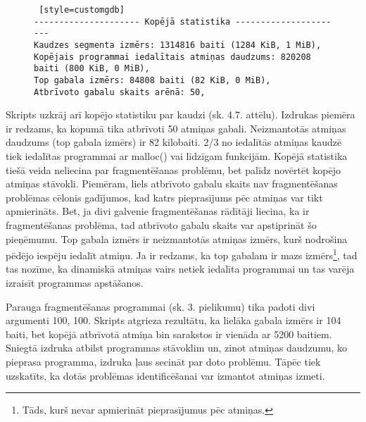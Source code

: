 \begin{figure}[h]
\begin{lstlisting} [style=customgdb]
--------------------- Kopējā statistika ----------------------
Kaudzes segmenta izmērs: 1314816 baiti (1284 KiB, 1 MiB),
Kopējais programmai iedalītais atmiņas daudzums: 820208 baiti (800 KiB, 0 MiB),
Top gabala izmērs: 84808 baiti (82 KiB, 0 MiB),
Atbrīvoto gabalu skaits arēnā: 50,
\end{lstlisting}
\caption{\textbf{\fontsize{11}{12}\selectfont {Kopējā statistika}}}
\end{figure}

Skripts uzkrāj arī kopējo statistiku par kaudzi (sk. 4.7. attēlu). Izdrukas piemēra  ir redzams, ka kopumā tika atbrīvoti 50 atmiņas gabali.
Neizmantotās atmiņas daudzums (top gabala izmērs) ir 82 kilobaiti.
2/3 no iedalītās atmiņas kaudzē tiek iedalītas programmai ar malloc() vai līdzīgam funkcijām.
Kopējā statistika tiešā veida neliecina par fragmentēšanas problēmu, bet palīdz novērtēt kopējo atmiņas stāvokli.
Piemēram, liels atbrīvoto gabalu skaits nav fragmentēšanas problēmas cēlonis gadījumos, kad katrs pieprasījums pēc atmiņas var tikt apmierināts.
Bet, ja divi galvenie fragmentēšanas rādītāji liecina, ka ir fragmentēšanas problēma, tad atbrīvoto gabalu skaits var apstiprināt šo pieņēmumu.
Top gabala izmērs ir neizmantotās atmiņas izmērs, kurš nodrošina pēdējo iespēju iedalīt atmiņu.
Ja ir redzams, ka top gabalam ir mazs izmērs\footnote{Tāds, kurš nevar apmierināt pieprasījumus pēc atmiņas.}, tad tas nozīme, ka dinamiskā atmiņas vairs netiek iedalīta programmai un tas varēja izraisīt programmas apstāšanos.

Parauga fragmentēšanas programmai (sk. 3. pielikumu) tika padoti divi argumenti 100, 100. 
Skripts atgrieza rezultātu, ka lielāka gabala izmērs ir 104 baiti, bet kopējā atbrīvotā atmiņa bin sarakstos ir vienāda ar 5200 baitiem.
Sniegtā izdruka atbilst programmas stāvoklim un, zinot atmiņas daudzumu, ko pieprasa programma, izdruka ļaus secināt par doto problēmu.
Tāpēc tiek uzskatīts, ka dotās problēmas identificēšanai var izmantot atmiņas izmeti.





